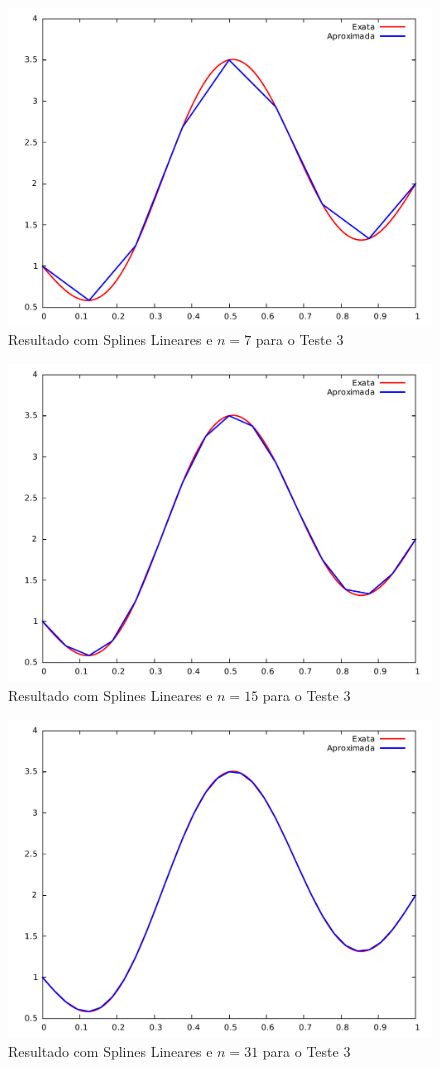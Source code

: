 \documentclass[12pt,a4paper]{report}
\begin{document}
\begin{figure}[H]
\centering
\includegraphics[width=0.8\linewidth]{t3splin7.pdf}
\caption{\label{splin}Resultado com Splines Lineares e $n=7$ para o Teste 3}
\end{figure}
\begin{figure}[H]
\centering
\includegraphics[width=0.8\linewidth]{t3splin15.pdf}
\caption{\label{splin}Resultado com Splines Lineares e $n=15$ para o Teste 3}
\end{figure}
\begin{figure}[H]
\centering
\includegraphics[width=0.8\linewidth]{t3splin31.pdf}
\caption{\label{splin}Resultado com Splines Lineares e $n=31$ para o Teste 3}
\end{figure}
\end{document}
